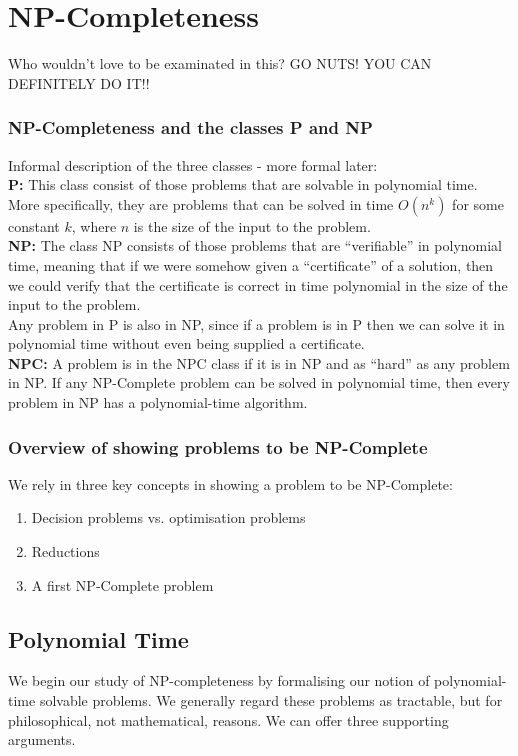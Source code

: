 \section{NP-Completeness}
Who wouldn't love to be examinated in this? GO NUTS! YOU CAN DEFINITELY DO IT!!

\subsubsection{NP-Completeness and the classes P and NP}
Informal description of the three classes - more formal later:\\

\textbf{P:} This class consist of those problems that are solvable in polynomial time. More specifically, they are problems that can be solved in time $O(n^k)$ for some constant $k$, where $n$ is the size of the input to the problem. \\

\textbf{NP:} The class NP consists of those problems that are ``verifiable'' in polynomial time, meaning that if we were somehow given a ``certificate'' of a solution, then we could verify that the certificate is correct in time polynomial in the size of the input to the problem. \\

Any problem in P is also in NP, since if a problem is in P then we can solve it in polynomial time without even being supplied a certificate.\\

\textbf{NPC:} A problem is in the NPC class if it is in NP and as ``hard'' as any problem in NP. If any NP-Complete problem can be solved in polynomial time, then every problem in NP has a polynomial-time algorithm. 

\subsubsection{Overview of showing problems to be NP-Complete}
We rely in three key concepts in showing a problem to be NP-Complete:

\begin{enumerate}
	\item Decision problems vs. optimisation problems 
	\item Reductions
	\item A first NP-Complete problem
\end{enumerate}

\subsection{Polynomial Time}
We begin our study of NP-completeness by formalising our notion of polynomial- time solvable problems. We generally regard these problems as tractable, but for philosophical, not mathematical, reasons. We can offer three supporting arguments.

